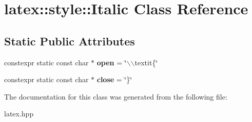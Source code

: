 \hypertarget{classlatex_1_1style_1_1Italic}{\section{latex\-:\-:style\-:\-:\-Italic \-Class \-Reference}
\label{classlatex_1_1style_1_1Italic}
}
\subsection*{\-Static \-Public \-Attributes}
\begin{DoxyCompactItemize}
\item 
\hypertarget{classlatex_1_1style_1_1Italic_a9dacb3fa2bda2a9efc06cbe306b8a1a2}{constexpr static const char $\ast$ {\bfseries open} = \char`\"{}$\backslash$$\backslash$textit\{\char`\"{}}\label{classlatex_1_1style_1_1Italic_a9dacb3fa2bda2a9efc06cbe306b8a1a2}

\item 
\hypertarget{classlatex_1_1style_1_1Italic_af84fcee42a6e6a9b49de0cba5276e609}{constexpr static const char $\ast$ {\bfseries close} = \char`\"{}\}\char`\"{}}\label{classlatex_1_1style_1_1Italic_af84fcee42a6e6a9b49de0cba5276e609}

\end{DoxyCompactItemize}


\-The documentation for this class was generated from the following file\-:\begin{DoxyCompactItemize}
\item 
latex.\-hpp\end{DoxyCompactItemize}
